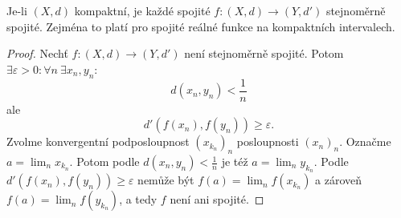 \documentclass[../main.tex]{subfiles}
\begin{document}
\begin{theorem}
	Je-li $(X,d)$ kompaktní, je každé spojité $f : (X,d) \rightarrow (Y,d')$ stejnoměrně spojité. Zejména to platí 
	pro spojité reálné funkce na kompaktních intervalech.
\end{theorem}

\begin{proof}
	Nechť $f : (X,d) \rightarrow (Y,d')$ není stejnoměrně spojité. Potom $\exists \varepsilon > 0 : \forall n\ \exists x_n, y_n :$
	\[d(x_n,y_n) < \frac{1}{n}\]
	ale
	\[d'(f(x_n),f(y_n)) \geq \varepsilon.\]
	Zvolme konvergentní podposloupnost $(x_{k_n})_n$ posloupnosti $(x_n)_n$. Označme $a = \lim_n x_{k_n}.$ Potom podle $d(x_n,y_n) < \frac{1}{n}$ je též 
	$a = \lim_n y_{k_n}.$ Podle $d'(f(x_n),f(y_n)) \geq \varepsilon$ nemůže být $f(a) = \lim_n f(x_{k_n})$ a zároveň $f(a) = \lim_n f(y_{k_n})$, 
	a tedy $f$ není ani spojité.
\end{proof}
\end{document}

